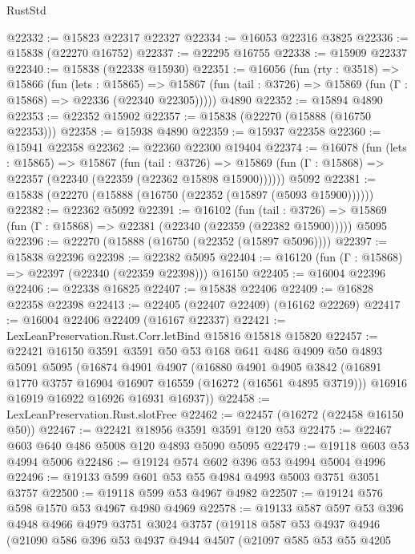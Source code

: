 \begin{lexlean}{RustStd}
\begin{coremodule}
@22332 := @15823 @22317 @22327
@22334 := @16053 @22316 @3825
@22336 := @15838 (@22270 @16752)
@22337 := @22295 @16755
@22338 := @15909 @22337
@22340 := @15838 (@22338 @15930)
@22351 := @16056
    (fun (rty : @3518) =>
    @15866
      (fun (lets : @15865) =>
      @15867 (fun (tail : @3726) => @15869 (fun (Γ : @15868) => @22336 (@22340 @22305)))))
    @4890
@22352 := @15894 @4890
@22353 := @22352 @15902
@22357 := @15838 (@22270 (@15888 (@16750 @22353)))
@22358 := @15938 @4890
@22359 := @15937 @22358
@22360 := @15941 @22358
@22362 := @22360 @22300 @19404
@22374 := @16078
    (fun (lets : @15865) =>
    @15867
      (fun (tail : @3726) =>
      @15869 (fun (Γ : @15868) => @22357 (@22340 (@22359 (@22362 @15898 @15900))))))
    @5092
@22381 := @15838 (@22270 (@15888 (@16750 (@22352 (@15897 (@5093 @15900))))))
@22382 := @22362 @5092
@22391 := @16102
    (fun (tail : @3726) => @15869 (fun (Γ : @15868) => @22381 (@22340 (@22359 (@22382 @15900)))))
    @5095
@22396 := @22270 (@15888 (@16750 (@22352 (@15897 @5096))))
@22397 := @15838 @22396
@22398 := @22382 @5095
@22404 := @16120 (fun (Γ : @15868) => @22397 (@22340 (@22359 @22398))) @16150
@22405 := @16004 @22396
@22406 := @22338 @16825
@22407 := @15838 @22406
@22409 := @16828 @22358 @22398
@22413 := @22405 (@22407 @22409) (@16162 @22269)
@22417 := @16004 @22406 @22409 (@16167 @22337)
@22421 := LexLeanPreservation.Rust.Corr.letBind @15816 @15818 @15820
@22457 := @22421
    @16150
    @3591
    @3591
    @50
    @53
    @168
    @641
    @486
    @4909
    @50
    @4893
    @5091
    @5095
    (@16874
      @4901
      @4907
      (@16880
        @4901
        @4905
        @3842
        (@16891 @1770 @3757 @16904 @16907 @16559 (@16272 (@16561 @4895 @3719)))
        @16916
        @16919
        @16922
        @16926
        @16931
        @16937))
@22458 := LexLeanPreservation.Rust.slotFree
@22462 := @22457 (@16272 (@22458 @16150 @50))
@22467 := @22421 @18956 @3591 @3591 @120 @53
@22475 := @22467 @603 @640 @486 @5008 @120 @4893 @5090 @5095
@22479 := @19118 @603 @53 @4994 @5006
@22486 := @19124 @574 @602 @396 @53 @4994 @5004 @4996
@22496 := @19133 @599 @601 @53 @55 @4984 @4993 @5003 @3751 @3051 @3757
@22500 := @19118 @599 @53 @4967 @4982
@22507 := @19124 @576 @598 @1570 @53 @4967 @4980 @4969
@22578 := @19133
    @587
    @597
    @53
    @396
    @4948
    @4966
    @4979
    @3751
    @3024
    @3757
    (@19118
      @587
      @53
      @4937
      @4946
      (@21090
        @586
        @396
        @53
        @4937
        @4944
        @4507
        (@21097
          @585
          @53
          @55
          @4205

\end{coremodule}
\end{lexlean}
